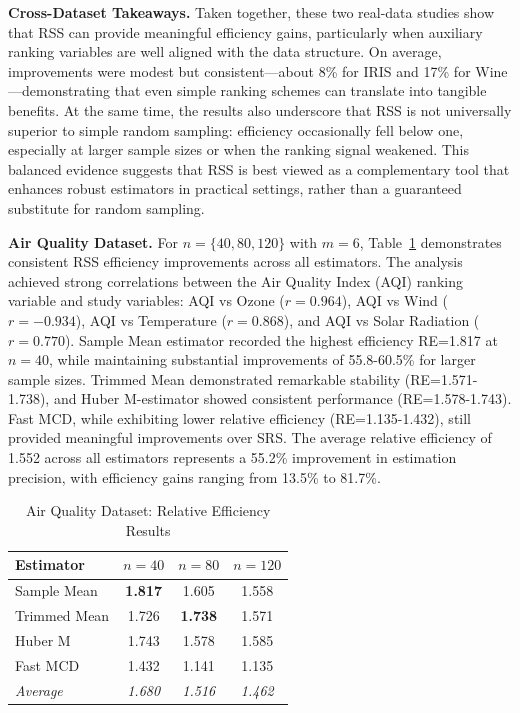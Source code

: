 \documentclass[12pt]{article}
\makeatletter
\let\oldparagraph\paragraph
\renewcommand{\paragraph}{
    \@ifstarcorollary
      \xxxParagraphStar
      \xxxParagraphNoStar
  }
\newcommand{\xxxParagraphStar}[1]{\oldparagraph*{#1}\mbox{}}
\newcommand{\xxxParagraphNoStar}[1]{\oldparagraph{#1}\mbox{}}
\makeatother
\begin{document}
{\bf Cross-Dataset Takeaways.}
Taken together, these two real-data studies show that RSS can provide meaningful efficiency gains, particularly when auxiliary ranking variables are well aligned with the data structure.
On average, improvements were modest but consistent—about 8\% for IRIS and 17\% for Wine—demonstrating that even simple ranking schemes can translate into tangible benefits.
At the same time, the results also underscore that RSS is not universally superior to simple random sampling: efficiency occasionally fell below one, especially at larger sample sizes or when the ranking signal weakened.
This balanced evidence suggests that RSS is best viewed as a complementary tool that enhances robust estimators in practical settings, rather than a guaranteed substitute for random sampling.


{\bf Air Quality Dataset.}
For $n=\{40,80,120\}$ with $m=6$, Table~\ref{tab:air_quality_results} demonstrates consistent RSS efficiency improvements across all estimators. The analysis achieved strong correlations between the Air Quality Index (AQI) ranking variable and study variables: AQI vs Ozone ($r=0.964$), AQI vs Wind ($r=-0.934$), AQI vs Temperature ($r=0.868$), and AQI vs Solar Radiation ($r=0.770$). Sample Mean estimator recorded the highest efficiency RE=1.817 at $n=40$, while maintaining substantial improvements of 55.8-60.5\% for larger sample sizes. Trimmed Mean demonstrated remarkable stability (RE=1.571-1.738), and Huber M-estimator showed consistent performance (RE=1.578-1.743). Fast MCD, while exhibiting lower relative efficiency (RE=1.135-1.432), still provided meaningful improvements over SRS. The average relative efficiency of 1.552 across all estimators represents a 55.2\% improvement in estimation precision, with efficiency gains ranging from 13.5\% to 81.7\%.

\begin{table}[htbp]
\centering
\caption{Air Quality Dataset: Relative Efficiency Results}
\label{tab:air_quality_results}
\begin{tabular}{lccc}
\hline
Estimator & $n=40$ & $n=80$ & $n=120$ \\
\hline
Sample Mean & \textbf{1.817} & 1.605 & 1.558 \\
Trimmed Mean & 1.726 & \textbf{1.738} & 1.571 \\
Huber M & 1.743 & 1.578 & 1.585 \\
Fast MCD & 1.432 & 1.141 & 1.135 \\
\hline
\textit{Average} & \textit{1.680} & \textit{1.516} & \textit{1.462} \\
\hline
\end{tabular}
\end{table}
\end{document}
